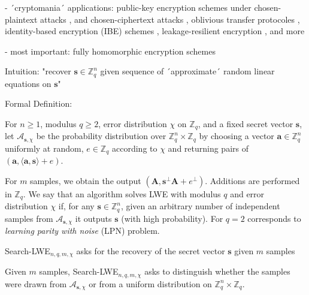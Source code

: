 \documentclass[
  a4paper,  %
  twoside,  %
  bibliography=totoc,
  headsepline,
  cleardoublepage=empty,
  parskip=half,
  draft=false
]{scrbook}
\begin{document}
- ´cryptomania´ applications: public-key encryption schemes under chosen-plaintext attacks \cite{Reg05, KTX07, PVW08}, and chosen-ciphertext attacks \cite{PW08, Pei09}, oblivious transfer protocoles \cite{PVW08}, identity-based encryption (IBE) schemes \cite{GPV08, CHKP10, ABB10}, leakage-resilient encryption \cite{AGV09, ACPS09, DGKPV10, GKPV10}, and more %

- most important: fully homomorphic encryption schemes \cite{Gen09a, BV11, Bra12, GSW13} %

Intuition: "recover $\textbf{s} \in \mathbb{Z}_q^n$ given sequence of ´approximate´ random linear equations on $\textbf{s}$" 

Formal Definition: 
\begin{definition} %
  For $n \geq 1$, modulus $q \geq 2$, error distribution $\chi$ on $\mathbb{Z}_q$, and a fixed secret vector $\textbf{s}$, let $\mathcal{A}_{\textbf{s}, \chi}$ be the probability distribution over $\mathbb{Z}_q^n \times \mathbb{Z}_q$ by choosing a vector $\textbf{a} \in \mathbb{Z}_q^n$ uniformly at random, $e \in \mathbb{Z}_q$ according to $\chi$ and returning pairs of $(\textbf{a}, \langle \textbf{a}, \textbf{s} \rangle + e)$.
\end{definition}

For $m$ samples, we obtain the output $(\textbf{A}, \textbf{s}^\perp \textbf{A} + e^\perp)$. Additions are performed in $\mathbb{Z}_q$. We say that an algorithm solves LWE with modulus $q$ and error distribution $\chi$ if, for any $\textbf{s} \in \mathbb{Z}_q^n$, given an arbitrary number of independent samples from $\mathcal{A}_{\textbf{s}, \chi}$ it outputs $\textbf{s}$ (with high probability). For $q=2$ corresponds to \textit{learning parity with noise} (LPN) problem.

\begin{definition}
  Search-LWE$_{n, q, m, \chi}$ asks for the recovery of the secret vector $\textbf{s}$ given $m$ samples %
\end{definition}

\begin{definition}
  Given $m$ samples, Search-LWE$_{n, q, m, \chi}$ asks to distinguish whether the samples were drawn from  $\mathcal{A}_{\textbf{s}, \chi}$ or from a uniform distribution on $\mathbb{Z}_q^n \times \mathbb{Z}_q$.
\end{definition}
\end{document}
